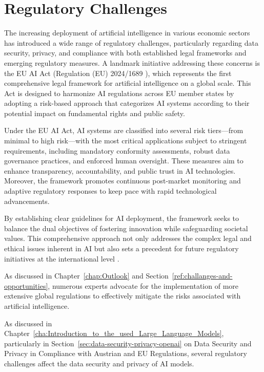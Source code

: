 \cite{AiAutomation}
\cite{AIAutomation2}

\section{Regulatory Challenges}
\label{sec:regulatory-challanges}

The increasing deployment of artificial intelligence in various economic sectors has introduced a wide range of regulatory challenges, particularly regarding data security, privacy, and compliance with both established legal frameworks and emerging regulatory measures. A landmark initiative addressing these concerns is the EU AI Act (Regulation (EU) 2024/1689 \cite{EU-AI-Act-text}), which represents the first comprehensive legal framework for artificial intelligence on a global scale. This Act is designed to harmonize AI regulations across EU member states by adopting a risk-based approach that categorizes AI systems according to their potential impact on fundamental rights and public safety.

Under the EU AI Act, AI systems are classified into several risk tiers—from minimal to high risk—with the most critical applications subject to stringent requirements, including mandatory conformity assessments, robust data governance practices, and enforced human oversight. These measures aim to enhance transparency, accountability, and public trust in AI technologies. Moreover, the framework promotes continuous post-market monitoring and adaptive regulatory responses to keep pace with rapid technological advancements.

By establishing clear guidelines for AI deployment, the framework seeks to balance the dual objectives of fostering innovation while safeguarding societal values. This comprehensive approach not only addresses the complex legal and ethical issues inherent in AI but also sets a precedent for future regulatory initiatives at the international level \cite{EURegFrameworkAI}.

As discussed in Chapter~\ref{chap:Outlook} and Section~\ref{ref:challanges-and-opportunities}, numerous experts advocate for the implementation of more extensive global regulations to effectively mitigate the risks associated with artificial intelligence.


As discussed in Chapter~\ref{cha:Introduction_to_the_used_Large_Language_Models}, particularly in Section~\ref{sec:data-security-privacy-openai} on Data Security and Privacy in Compliance with Austrian and EU Regulations, several regulatory challenges affect the data security and privacy of AI models.

